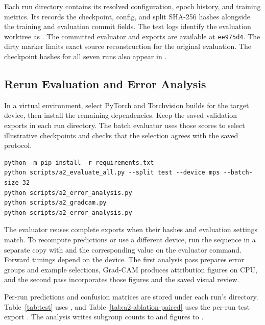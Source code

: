 Each run directory contains its resolved configuration, epoch history, and training metrics. Its  records the checkpoint, config, and split SHA-256 hashes alongside the training and evaluation commit fields. The test logs identify the evaluation worktree as . The committed evaluator and exports are available at \texttt{ee975d4}. The dirty marker limits exact source reconstruction for the original evaluation. The checkpoint hashes for all seven runs also appear in .

\clearpage
\subsection{Rerun Evaluation and Error Analysis}

In a virtual environment, select PyTorch and Torchvision builds for the target device, then install the remaining dependencies. Keep the saved validation exports in each run directory. The batch evaluator uses those scores to select illustrative checkpoints and checks that the selection agrees with the saved protocol.

\begin{verbatim}
python -m pip install -r requirements.txt
python scripts/a2_evaluate_all.py --split test --device mps --batch-size 32
python scripts/a2_error_analysis.py
python scripts/a2_gradcam.py
python scripts/a2_error_analysis.py
\end{verbatim}

The evaluator reuses complete exports when their hashes and evaluation settings match. To recompute predictions or use a different device, run the sequence in a separate copy with  and the corresponding  value on the evaluator command. Forward timings depend on the device. The first analysis pass prepares error groups and example selections, Grad-CAM produces attribution figures on CPU, and the second pass incorporates those figures and the saved visual review.

Per-run predictions and confusion matrices are stored under each run's  directory. Table~\ref{tab:test} uses , and Table~\ref{tab:a2-ablation-paired} uses the per-run test export . The analysis writes subgroup counts to  and figures to .

